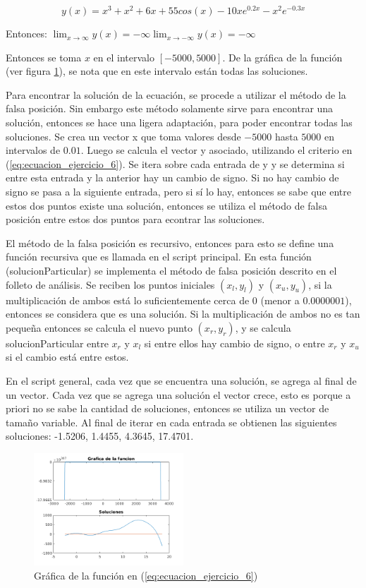 \documentclass[12pt,letterpaper]{article}
\begin{document}
\begin{equation}
y(x)=x^3+x^2+6x+55cos(x)-10xe^{0.2x}-x^2e^{-0.3x}
\label{eq:ecuacion_ejercicio_6}
\end{equation}

Entonces:
$\lim_{x\to\infty} y(x)=-\infty
\lim_{x\to -\infty} y(x)=-\infty $

Entonces se toma $x$ en el intervalo $[-5000, 5000]$. De la gráfica de la función (ver figura \ref{fig:ejercicio_6_grafica}), se nota que en este intervalo están todas las soluciones.

Para encontrar la solución de la ecuación, se procede a utilizar el método de la falsa posición. Sin embargo este método solamente sirve para encontrar una solución, entonces se hace una ligera adaptación, para poder encontrar todas las soluciones. Se crea un vector x que toma valores desde $-5000$ hasta $5000$ en intervalos de $0.01$. Luego se calcula el vector y asociado, utilizando el criterio en (\ref{eq:ecuacion_ejercicio_6}). Se itera sobre cada entrada de y y se determina si entre esta entrada y la anterior hay un cambio de signo. Si no hay cambio de signo se pasa a la siguiente entrada, pero si sí lo hay, entonces se sabe que entre estos dos puntos existe una solución, entonces se utiliza el método de falsa posición entre estos dos puntos para econtrar las soluciones. 

El método de la falsa posición es recursivo, entonces para esto se define una función recursiva que es llamada en el script principal. En esta función (solucionParticular) se implementa el método de falsa posición descrito en el folleto de análisis. Se reciben los puntos iniciales $(x_l, y_l)$ y $(x_u, y_u)$, si la multiplicación de ambos está lo suficientemente cerca de $0$ (menor a $0.0000001$), entonces se considera que es una solución. Si la multiplicación de ambos no es tan pequeña entonces se calcula el nuevo punto $(x_r, y_r)$, y se calcula solucionParticular entre $x_r$ y $x_l$ si entre ellos hay cambio de signo, o entre $x_r$ y $x_u$ si el cambio está entre estos. 

En el script general, cada vez que se encuentra una solución, se agrega al final de un vector. Cada vez que se agrega una solución el vector crece, esto es porque a priori no se sabe la cantidad de soluciones, entonces se utiliza un vector de tamaño variable. Al final de iterar en cada entrada se obtienen las siguientes soluciones: -1.5206, 1.4455, 4.3645, 17.4701.

\begin{figure}
	\centering
	\includegraphics[width=0.5\textwidth]{pictures/ejercicio_6_grafica}
	\caption{Gráfica de la función en (\ref{eq:ecuacion_ejercicio_6})}
	\label{fig:ejercicio_6_grafica}
\end{figure} 
\end{document}
